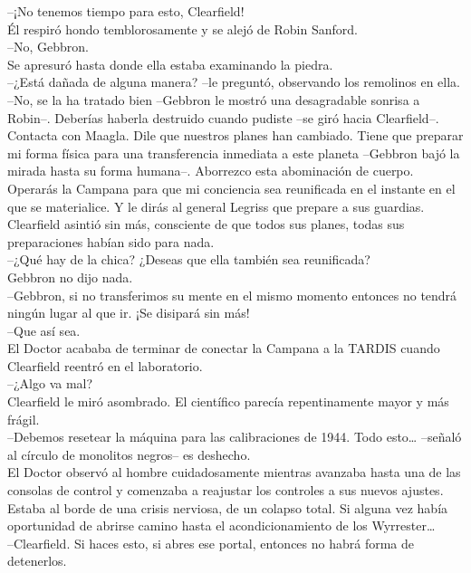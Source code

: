 --¡No tenemos tiempo para esto, Clearfield!\\
Él respiró hondo temblorosamente y se alejó de Robin Sanford.\\
--No, Gebbron.\\
Se apresuró hasta donde ella estaba examinando la piedra.\\
--¿Está dañada de alguna manera? --le preguntó, observando los remolinos
en ella.\\
--No, se la ha tratado bien --Gebbron le mostró una desagradable sonrisa
a Robin--. Deberías haberla destruido cuando pudiste --se giró hacia
Clearfield--. Contacta con Maagla. Dile que nuestros planes han
cambiado. Tiene que preparar mi forma física para una transferencia
inmediata a este planeta --Gebbron bajó la mirada hasta su forma
humana--. Aborrezco esta abominación de cuerpo. Operarás la Campana para
que mi conciencia sea reunificada en el instante en el que se
materialice. Y le dirás al general Legriss que prepare a sus guardias.\\
Clearfield asintió sin más, consciente de que todos sus planes, todas
sus preparaciones habían sido para nada.\\
--¿Qué hay de la chica? ¿Deseas que ella también sea reunificada?\\
Gebbron no dijo nada.\\
--Gebbron, si no transferimos su mente en el mismo momento entonces no
tendrá ningún lugar al que ir. ¡Se disipará sin más!\\
--Que así sea.\\[2\baselineskip]El Doctor acababa de terminar de
conectar la Campana a la TARDIS cuando Clearfield reentró en el
laboratorio.\\
--¿Algo va mal?\\
Clearfield le miró asombrado. El científico parecía repentinamente mayor
y más frágil.\\
--Debemos resetear la máquina para las calibraciones de 1944. Todo
esto\ldots{} --señaló al círculo de monolitos negros-- es deshecho.\\
El Doctor observó al hombre cuidadosamente mientras avanzaba hasta una
de las consolas de control y comenzaba a reajustar los controles a sus
nuevos ajustes. Estaba al borde de una crisis nerviosa, de un colapso
total. Si alguna vez había oportunidad de abrirse camino hasta el
acondicionamiento de los Wyrrester\ldots{}\\
--Clearfield. Si haces esto, si abres ese portal, entonces no habrá
forma de detenerlos.\\
